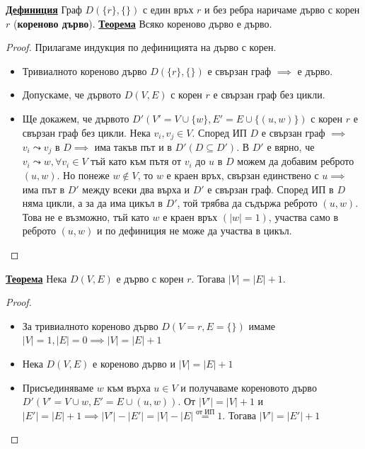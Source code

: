 \documentclass{article}
\begin{document}
\textbf{\underline{Дефиниция}}
Граф $D(\{r\}, \{\})$ с един връх $r$ и без ребра наричаме дърво с корен $r$ (\textbf{кореново дърво}). \newline\newline
\textbf{\underline{Теорема}} \newline
Всяко кореново дърво е дърво.
\begin{proof}
Прилагаме индукция по дефиницията на дърво с корен.
\begin{itemize}
    \item Тривиалното кореново дърво $D(\{r\}, \{\})$ е свързан граф $\implies$ е дърво.
    \item Допускаме, че дървото $D(V, E)$ с корен $r$ е свързан граф без цикли.
    \item Ще докажем, че дървото $D'(V' = V \cup \{w\}, E' = E \cup \{(u, w)\})$ с корен $r$ е свързан граф без цикли. \newline\newline
    Нека $v_i, v_j \in V$. Според ИП $D$ е свързан граф $\implies$ $v_i \leadsto v_j$ в $D \implies$ има такъв път и в $D' (D \subseteq D')$.
    В $D'$ е вярно, че $v_i \leadsto w, \forall v_i \in V$ тъй като към пътя от $v_i$ до $u$ в $D$ можем да добавим
    реброто $(u, w)$. Но понеже $w \notin V$, то $w$ е краен връх, свързан единствено с $u \implies$ има път в $D'$ между
    всеки два върха и $D'$ е свързан граф. \newline\newline Според ИП в $D$ няма цикли, а за да има цикъл в $D'$, той трябва да съдържа
    реброто $(u, w)$. Това не е възможно, тъй като $w$ е краен връх $(|w| = 1)$, участва само в реброто $(u, w)$ и по дефиниция не може да участва в цикъл.
\end{itemize}
\end{proof}
\textbf{\underline{Теорема}} \newline
Нека $D(V, E)$ е дърво с корен $r$. Тогава $|V| = |E| + 1$.
\begin{proof}
    $ $
    \begin{itemize}
        \item За тривиалното кореново дърво $D(V = {r}, E = \{\})$ имаме \newline $|V| = 1, |E| = 0 \implies |V| = |E| + 1$
        \item Нека $D(V, E)$ е кореново дърво и $|V| = |E| + 1$
        \item Присъединяваме $w$ към върха $u \in V$ и получаваме кореновото дърво $D'(V' = V \cup {w}, E' = E \cup {(u, w)})$. От
        $|V'| = |V| + 1$ и $|E'| = |E| + 1 \implies |V'| - |E'| = |V| - |E| \overset{\text{от ИП}}{=} 1$. Тогава $|V'| = |E'| + 1$
    \end{itemize}
\end{proof}
\end{document}
